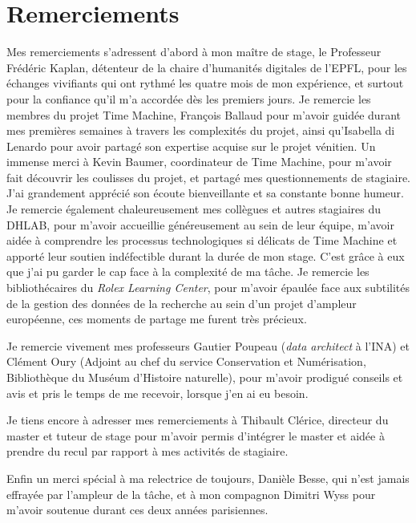 \chapter*{Remerciements}


Mes remerciements s'adressent d'abord à mon maître de stage, le Professeur Frédéric Kaplan, détenteur de la chaire d'humanités digitales de l'EPFL, pour les échanges vivifiants qui ont rythmé les quatre mois de mon expérience, et surtout pour la confiance qu'il m'a accordée dès les premiers jours. Je remercie les membres du projet Time Machine, François Ballaud pour m'avoir guidée durant mes premières semaines à travers les complexités du projet, ainsi qu'Isabella di Lenardo pour avoir partagé son expertise acquise sur le projet vénitien. Un immense merci à Kevin Baumer, coordinateur de Time Machine, pour m'avoir fait découvrir les coulisses du projet, et partagé mes questionnements de stagiaire. J'ai grandement apprécié son écoute bienveillante et sa constante bonne humeur.
Je remercie également chaleureusement mes collègues et autres stagiaires du DHLAB, pour m'avoir accueillie généreusement au sein de leur équipe, m'avoir aidée à comprendre les processus technologiques si délicats de Time Machine et apporté leur soutien indéfectible durant la durée de mon stage. C'est grâce à eux que j'ai pu garder le cap face à la complexité de ma tâche. Je remercie  les bibliothécaires du \textit{Rolex Learning Center}, pour m'avoir épaulée face aux subtilités de la gestion des données de la recherche au sein d'un projet d'ampleur européenne, ces moments de partage me furent très précieux. 

Je remercie vivement mes professeurs Gautier Poupeau (\textit{data architect} à l'INA) et Clément Oury (Adjoint au chef du service Conservation et Numérisation, Bibliothèque du Muséum d'Histoire naturelle), pour m'avoir prodigué conseils et avis et pris le temps de me recevoir, lorsque j'en ai eu besoin.

Je tiens encore à adresser mes remerciements à Thibault Clérice, directeur du master et tuteur de stage pour m'avoir permis d'intégrer le master et aidée à prendre du recul par rapport à mes activités de stagiaire. 

Enfin un merci spécial à ma relectrice de toujours, Danièle Besse, qui n'est jamais effrayée par l'ampleur de la tâche, et à mon compagnon Dimitri Wyss pour m'avoir soutenue durant ces deux années parisiennes.


